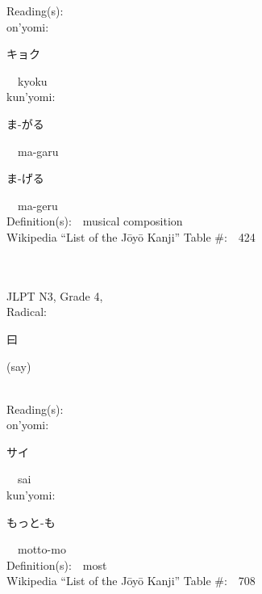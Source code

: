 \begin{multicols}{2}
Reading(s):\ \ \\
{\hspace*{1em}}on'yomi:\ \ \\
{\hspace*{2em}}{\begin{CJK}{UTF8}{min} キョク \end{CJK}}\ \ kyoku\ \ \\
{\hspace*{1em}}kun'yomi:\ \ \\
{\hspace*{2em}}{\begin{CJK}{UTF8}{min} ま-がる \end{CJK}}\ \ ma-garu\ \ \\
{\hspace*{2em}}{\begin{CJK}{UTF8}{min} ま-げる \end{CJK}}\ \ ma-geru\ \ \\
Definition(s):\ \ musical composition \\
Wikipedia ``List of the J\=oy\=o Kanji'' Table \#:\ \ 424 \\
\ \ \\
{\fontsize{34pt}{40pt}  }\ \ \\  %
{JLPT N3, Grade 4, \\Radical:\ \ {\begin{CJK}{UTF8}{min} 曰 \end{CJK}} (say) } \\
Reading(s):\ \ \\
{\hspace*{1em}}on'yomi:\ \ \\
{\hspace*{2em}}{\begin{CJK}{UTF8}{min} サイ \end{CJK}}\ \ sai\ \ \\
{\hspace*{1em}}kun'yomi:\ \ \\
{\hspace*{2em}}{\begin{CJK}{UTF8}{min} もっと-も \end{CJK}}\ \ motto-mo\ \ \\
Definition(s):\ \ most \\
Wikipedia ``List of the J\=oy\=o Kanji'' Table \#:\ \ 708 \\

\end{multicols}
